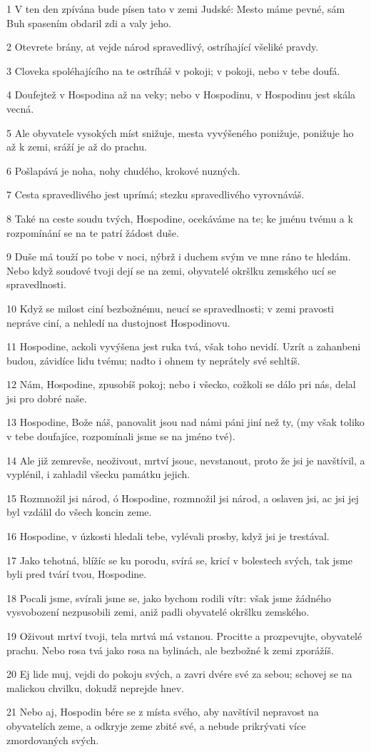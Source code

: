 \par 1 V ten den zpívána bude písen tato v zemi Judské: Mesto máme pevné, sám Buh spasením obdaril zdi a valy jeho.
\par 2 Otevrete brány, at vejde národ spravedlivý, ostríhající všeliké pravdy.
\par 3 Cloveka spoléhajícího na te ostríháš v pokoji; v pokoji, nebo v tebe doufá.
\par 4 Doufejtež v Hospodina až na veky; nebo v Hospodinu, v Hospodinu jest skála vecná.
\par 5 Ale obyvatele vysokých míst snižuje, mesta vyvýšeného ponižuje, ponižuje ho až k zemi, sráží je až do prachu.
\par 6 Pošlapává je noha, nohy chudého, krokové nuzných.
\par 7 Cesta spravedlivého jest uprímá; stezku spravedlivého vyrovnáváš.
\par 8 Také na ceste soudu tvých, Hospodine, ocekáváme na te; ke jménu tvému a k rozpomínání se na te patrí žádost duše.
\par 9 Duše má touží po tobe v noci, nýbrž i duchem svým ve mne ráno te hledám. Nebo když soudové tvoji dejí se na zemi, obyvatelé okršlku zemského ucí se spravedlnosti.
\par 10 Když se milost ciní bezbožnému, neucí se spravedlnosti; v zemi pravosti nepráve ciní, a nehledí na dustojnost Hospodinovu.
\par 11 Hospodine, ackoli vyvýšena jest ruka tvá, však toho nevidí. Uzrít a zahanbeni budou, závidíce lidu tvému; nadto i ohnem ty neprátely své sehltíš.
\par 12 Nám, Hospodine, zpusobíš pokoj; nebo i všecko, cožkoli se dálo pri nás, delal jsi pro dobré naše.
\par 13 Hospodine, Bože náš, panovalit jsou nad námi páni jiní než ty, (my však toliko v tebe doufajíce, rozpomínali jsme se na jméno tvé).
\par 14 Ale již zemrevše, neoživout, mrtví jsouc, nevstanout, proto že jsi je navštívil, a vyplénil, i zahladil všecku památku jejich.
\par 15 Rozmnožil jsi národ, ó Hospodine, rozmnožil jsi národ, a oslaven jsi, ac jsi jej byl vzdálil do všech koncin zeme.
\par 16 Hospodine, v úzkosti hledali tebe, vylévali prosby, když jsi je trestával.
\par 17 Jako tehotná, blížíc se ku porodu, svírá se, kricí v bolestech svých, tak jsme byli pred tvárí tvou, Hospodine.
\par 18 Pocali jsme, svírali jsme se, jako bychom rodili vítr: však jsme žádného vysvobození nezpusobili zemi, aniž padli obyvatelé okršlku zemského.
\par 19 Oživout mrtví tvoji, tela mrtvá má vstanou. Procitte a prozpevujte, obyvatelé prachu. Nebo rosa tvá jako rosa na bylinách, ale bezbožné k zemi zporážíš.
\par 20 Ej lide muj, vejdi do pokoju svých, a zavri dvére své za sebou; schovej se na malickou chvilku, dokudž neprejde hnev.
\par 21 Nebo aj, Hospodin bére se z místa svého, aby navštívil nepravost na obyvatelích zeme, a odkryje zeme zbité své, a nebude prikrývati více zmordovaných svých.

